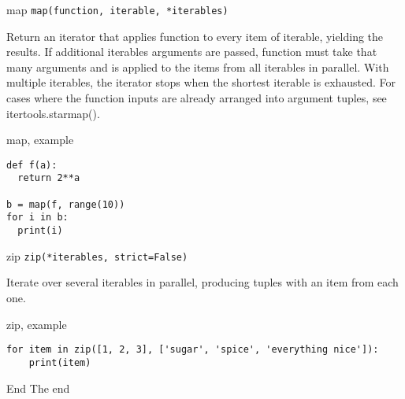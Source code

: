 \documentclass[10pt]{beamer}
\begin{document}
\begin{frame}[containsverbatim]{map}
\texttt{map(function, iterable, *iterables)}

Return an iterator that applies function to every item of iterable, yielding the results. If additional iterables arguments are passed, function must take that many arguments and is applied to the items from all iterables in parallel. With multiple iterables, the iterator stops when the shortest iterable is exhausted. For cases where the function inputs are already arranged into argument tuples, see itertools.starmap().
\end{frame}

\begin{frame}[containsverbatim]{map, example}
  \begin{verbatim}
def f(a):
  return 2**a

b = map(f, range(10))
for i in b:
  print(i)
  \end{verbatim}
\end{frame}

\begin{frame}[containsverbatim]{zip}
\texttt{zip(*iterables, strict=False)}

Iterate over several iterables in parallel, producing tuples with an item from each one.
\end{frame}

\begin{frame}[containsverbatim]{zip, example}
  \begin{verbatim}
for item in zip([1, 2, 3], ['sugar', 'spice', 'everything nice']):
    print(item)
  \end{verbatim}
\end{frame}

\begin{frame}[standout]{End}
  The end
\end{frame}
\end{document}
